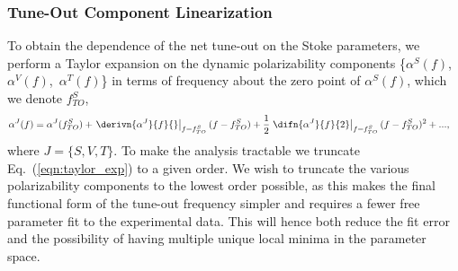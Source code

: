 \subsubsection{Tune-Out Component Linearization}
	To obtain the dependence of the net tune-out on the Stoke parameters, we perform a Taylor expansion on the dynamic polarizability components \{\(\alpha^S(f)\),\, \(\alpha^V(f)\),\, \(\alpha^T(f)\)\} in terms of frequency about the zero point of \(\alpha^S(f)\), which we denote \(f^{S}_{TO}\),
	\begin{align}
	    \alpha^J(f) &= \alpha^J(f^{S}_{TO}) + \left. \derivn{\alpha^J}{f}{{}}\right|_{f=f^{S}_{TO}} (f-f^{S}_{TO}) +\frac{1}{2}\left. \difn{\alpha^J}{f}{2}\right|_{f=f^{S}_{TO}}(f-f^{S}_{TO})^2 + ...,\label{eqn:taylor_exp}
	\end{align}
	where \(J=\{S,V,T\}\). To make the analysis tractable we truncate Eq.~(\ref{eqn:taylor_exp}) to a given order. We wish to truncate the various polarizability components to the lowest order possible, as this makes the final functional form of the tune-out frequency simpler and requires a fewer free parameter fit to the experimental data. This will hence both reduce the fit error and the possibility of having multiple unique local minima in the parameter space.

